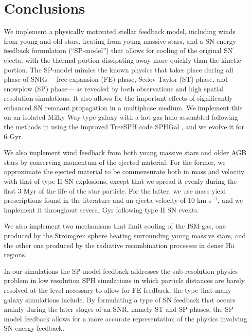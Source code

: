 \documentclass[iop]{emulateapj}
\begin{document}
\section{Conclusions}\label{sec:conclusions}
We implement a physically motivated stellar feedback model, including winds from young and old stars, heating from young massive stars, and a SN energy feedback formulation (``SP-model'') that allows for cooling of the original SN ejecta, with the thermal portion dissipating away more quickly than the kinetic portion. The SP-model mimics the known physics that takes place during all phase of SNRs ---free expansion (FE) phase, Sedov-Taylor (ST) phase, and snowplow (SP) phase--- as revealed by both observations and high spatial resolution simulations. It also allows for the important effects of significantly enhanced SN remnant propagation in a multiphase medium. We implement this on an isolated Milky Way-type galaxy with a hot gas halo assembled following the methods in \citet{Springel05a} using the improved TreeSPH code SPHGal \citep{Hu14}, and we evolve it for 6 Gyr.

We also implement wind feedback from both young massive stars and older AGB stars by conserving momentum of the ejected material. For the former, we approximate the ejected material to be commensurate both in mass and velocity with that of type II SN explosions, except that we spread it evenly during the first 3 Myr of the life of the star particle. For the latter, we use mass yield prescriptions found in the literature and an ejecta velocity of 10 km s$^{-1}$, and we implement it throughout several Gyr following type II SN events.

We also implement two mechanisms that limit cooling of the ISM gas, one produced by the Str\"omgren sphere heating surrounding young massive stars, and the other one produced by the radiative recombination processes in dense H\textsc{ii} regions.

In our simulations the SP-model feedback addresses the sub-resolution physics problem in low resolution SPH simulations in which particle distances are barely resolved at the level necessary to allow for FE feedback, the type that many galaxy simulations include. By formulating a type of SN feedback that occurs mainly during the later stages of an SNR, namely ST and SP phases, the SP-model feedback allows for a more accurate representation of the physics involving SN energy feedback.
\end{document}
